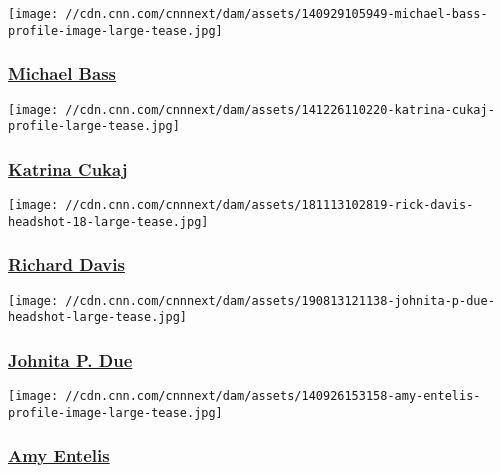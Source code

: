 \href{/profiles/michael-bass-profile}{}

\texttt{[image: //cdn.cnn.com/cnnnext/dam/assets/140929105949-michael-bass-profile-image-large-tease.jpg]}

\hypertarget{michael-bass}{%
\subsubsection{\texorpdfstring{\href{/profiles/michael-bass-profile}{Michael
Bass}}{Michael Bass}}\label{michael-bass}}

\href{/profiles/katrina-cukaj-profile}{}

\texttt{[image: //cdn.cnn.com/cnnnext/dam/assets/141226110220-katrina-cukaj-profile-large-tease.jpg]}

\hypertarget{katrina-cukaj}{%
\subsubsection{\texorpdfstring{\href{/profiles/katrina-cukaj-profile}{Katrina
Cukaj}}{Katrina Cukaj}}\label{katrina-cukaj}}

\href{/profiles/richard-davis-profile}{}

\texttt{[image: //cdn.cnn.com/cnnnext/dam/assets/181113102819-rick-davis-headshot-18-large-tease.jpg]}

\hypertarget{richard-davis}{%
\subsubsection{\texorpdfstring{\href{/profiles/richard-davis-profile}{Richard
Davis}}{Richard Davis}}\label{richard-davis}}

\href{/profiles/johnita-p-due}{}

\texttt{[image: //cdn.cnn.com/cnnnext/dam/assets/190813121138-johnita-p-due-headshot-large-tease.jpg]}

\hypertarget{johnita-p-due-}{%
\subsubsection{\texorpdfstring{\href{/profiles/johnita-p-due}{Johnita P.
Due }}{Johnita P. Due }}\label{johnita-p-due-}}

\href{/profiles/amy-entelis-profile}{}

\texttt{[image: //cdn.cnn.com/cnnnext/dam/assets/140926153158-amy-entelis-profile-image-large-tease.jpg]}

\hypertarget{amy-entelis}{%
\subsubsection{\texorpdfstring{\href{/profiles/amy-entelis-profile}{Amy
Entelis}}{Amy Entelis}}\label{amy-entelis}}

